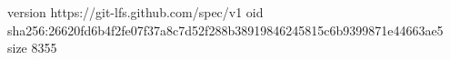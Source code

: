 version https://git-lfs.github.com/spec/v1
oid sha256:26620fd6b4f2fe07f37a8c7d52f288b38919846245815c6b9399871e44663ae5
size 8355
